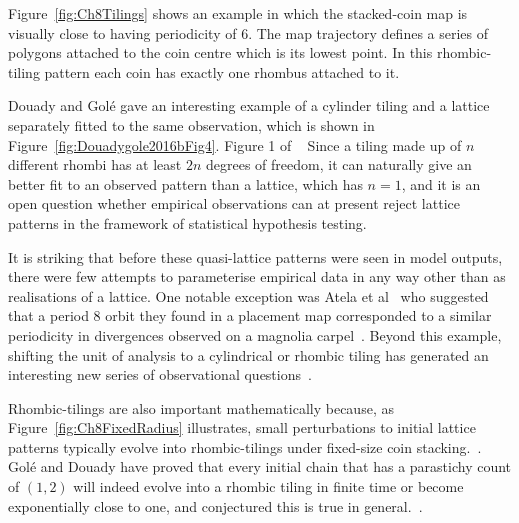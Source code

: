 Figure~\ref{fig:Ch8Tilings} shows an example in which the stacked-coin map is visually close to having periodicity of 6. The map trajectory defines a series of polygons attached to the coin centre which is its lowest point. In this rhombic-tiling pattern each coin has exactly one rhombus attached to it.

\clearpage
{}






\clearpage
Douady and Gol\'e gave an interesting example of a cylinder tiling and a lattice separately fitted to the same observation, which is shown in Figure~\ref{fig:Douadygole2016bFig4}.%
 {Figure 1 of ~\autocite{atelaRhombicTilingsPrimordia2017}} 
Since a tiling made up of $n$ different rhombi has at least $2n$ degrees of freedom, it can naturally give an better fit to an observed pattern than a lattice, which has $n=1$, and it is an open question whether empirical observations can at present reject lattice patterns in the framework of statistical hypothesis testing.%

It is striking that before these quasi-lattice patterns were seen in model outputs, there were few attempts to parameterise empirical data in any way other than as realisations of a lattice. One notable exception was Atela et al~\cite{atelaDynamicalSystemPlant2002} who suggested that a period 8 orbit they found in a placement map corresponded to a similar periodicity in divergences observed on a magnolia carpel~\cite{tuckerPhyllotaxisVascularOrganization1961}. 
Beyond this example, shifting the unit of analysis to a cylindrical or rhombic tiling has generated an interesting new series of observational questions~\autocite{douadyFibonacciQuasisymmetricPhyllotaxis2016}.


Rhombic-tilings are also important mathematically because, as Figure~\ref{fig:Ch8FixedRadius} illustrates, small perturbations to initial lattice patterns typically evolve into rhombic-tilings under fixed-size coin stacking.~\autocite{atelaRhombicTilingsPrimordia2017}.
Golé and Douady have proved that every initial chain that has a parastichy count of $(1,2)$ will indeed evolve into a rhombic tiling in finite time or become exponentially close to one, and conjectured 
this is true in general.~\autocite{goleConvergenceDiskStacking2020}.

